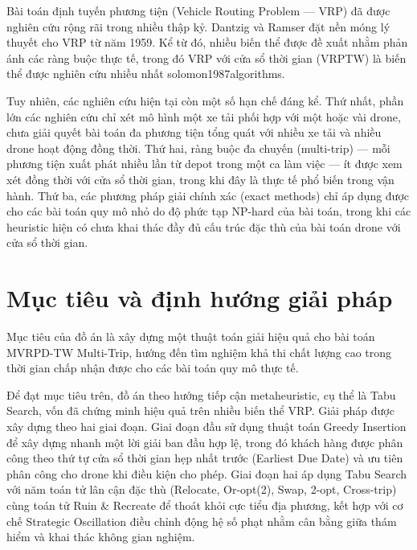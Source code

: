 \documentclass[../DoAn.tex]{subfiles}
\begin{document}
Bài toán định tuyến phương tiện (Vehicle Routing Problem --- VRP) đã được nghiên cứu rộng rãi trong nhiều thập kỷ. Dantzig và Ramser đặt nền móng lý thuyết cho VRP từ năm 1959. Kể từ đó, nhiều biến thể được đề xuất nhằm phản ánh các ràng buộc thực tế, trong đó VRP với cửa sổ thời gian (VRPTW) là biến thể được nghiên cứu nhiều nhất solomon1987algorithms.

Tuy nhiên, các nghiên cứu hiện tại còn một số hạn chế đáng kể. Thứ nhất, phần lớn các nghiên cứu chỉ xét mô hình một xe tải phối hợp với một hoặc vài drone, chưa giải quyết bài toán đa phương tiện tổng quát với nhiều xe tải và nhiều drone hoạt động đồng thời. Thứ hai, ràng buộc đa chuyến (multi-trip) --- mỗi phương tiện xuất phát nhiều lần từ depot trong một ca làm việc --- ít được xem xét đồng thời với cửa sổ thời gian, trong khi đây là thực tế phổ biến trong vận hành. Thứ ba, các phương pháp giải chính xác (exact methods) chỉ áp dụng được cho các bài toán quy mô nhỏ do độ phức tạp NP-hard của bài toán, trong khi các heuristic hiện có chưa khai thác đầy đủ cấu trúc đặc thù của bài toán drone với cửa sổ thời gian.

\section{Mục tiêu và định hướng giải pháp}

Mục tiêu của đồ án là xây dựng một thuật toán giải hiệu quả cho bài toán MVRPD-TW Multi-Trip, hướng đến tìm nghiệm khả thi chất lượng cao trong thời gian chấp nhận được cho các bài toán quy mô thực tế.

Để đạt mục tiêu trên, đồ án theo hướng tiếp cận metaheuristic, cụ thể là Tabu Search, vốn đã chứng minh hiệu quả trên nhiều biến thể VRP. Giải pháp được xây dựng theo hai giai đoạn. Giai đoạn đầu sử dụng thuật toán Greedy Insertion để xây dựng nhanh một lời giải ban đầu hợp lệ, trong đó khách hàng được phân công theo thứ tự cửa sổ thời gian hẹp nhất trước (Earliest Due Date) và ưu tiên phân công cho drone khi điều kiện cho phép. Giai đoạn hai áp dụng Tabu Search với năm toán tử lân cận đặc thù (Relocate, Or-opt(2), Swap, 2-opt, Cross-trip) cùng toán tử Ruin \& Recreate để thoát khỏi cực tiểu địa phương, kết hợp với cơ chế Strategic Oscillation điều chỉnh động hệ số phạt nhằm cân bằng giữa thám hiểm và khai thác không gian nghiệm.

\end{document}

